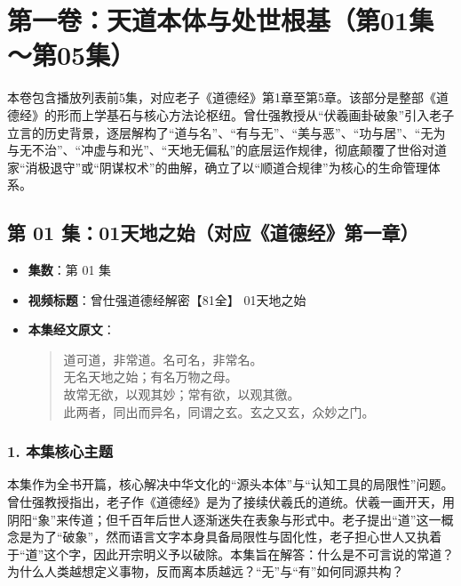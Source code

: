 \section*{第一卷：天道本体与处世根基（第01集～第05集）}

本卷包含播放列表前5集，对应老子《道德经》第1章至第5章。该部分是整部《道德经》的形而上学基石与核心方法论枢纽。曾仕强教授从“伏羲画卦破象”引入老子立言的历史背景，逐层解构了“道与名”、“有与无”、“美与恶”、“功与居”、“无为与无不治”、“冲虚与和光”、“天地无偏私”的底层运作规律，彻底颠覆了世俗对道家“消极退守”或“阴谋权术”的曲解，确立了以“顺道合规律”为核心的生命管理体系。

\clearpage

\subsection{第 01 集：01天地之始（对应《道德经》第一章）}
\label{sec:ep01}

\begin{itemize}
    \item \textbf{集数}：第 01 集
    \item \textbf{视频标题}：曾仕强道德经解密【81全】 01天地之始
    
    \item \textbf{本集经文原文}：
    \begin{quote}\kaishu
    道可道，非常道。名可名，非常名。\\
    无名天地之始；有名万物之母。\\
    故常无欲，以观其妙；常有欲，以观其徼。\\
    此两者，同出而异名，同谓之玄。玄之又玄，众妙之门。
    \end{quote}
\end{itemize}

\subsubsection{1. 本集核心主题}
本集作为全书开篇，核心解决中华文化的“源头本体”与“认知工具的局限性”问题。曾仕强教授指出，老子作《道德经》是为了接续伏羲氏的道统。伏羲一画开天，用阴阳“象”来传道；但千百年后世人逐渐迷失在表象与形式中。老子提出“道”这一概念是为了“破象”，然而语言文字本身具备局限性与固化性，老子担心世人又执着于“道”这个字，因此开宗明义予以破除。本集旨在解答：什么是不可言说的常道？为什么人类越想定义事物，反而离本质越远？“无”与“有”如何同源共构？

